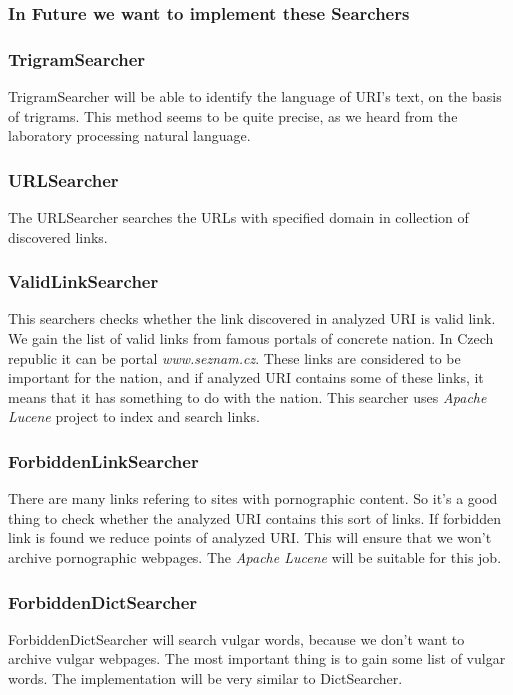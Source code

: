 \documentclass[11pt,a4paper]{article}
\begin{document}
\subsubsection*{In Future we want to implement these Searchers}

\subsubsection*{TrigramSearcher}
TrigramSearcher will be able to identify the language of URI's text, on the basis of trigrams. This method seems to be quite precise, as we heard from the laboratory processing natural language.

\subsubsection*{URLSearcher}
The URLSearcher searches the URLs with specified domain in collection of discovered links.

\subsubsection*{ValidLinkSearcher}
This searchers checks whether the link discovered in analyzed URI is valid link. We gain the list of valid links from famous portals of concrete nation. In Czech republic it can be portal \emph{www.seznam.cz}. These links are considered to be important for the nation, and if analyzed URI contains some of these links, it means that it has something to do with the nation. This searcher uses \emph{Apache Lucene} project to index and search links.

\subsubsection*{ForbiddenLinkSearcher}
There are many links refering to sites with pornographic content. So it's a good thing to check whether the analyzed URI contains this sort of links. If forbidden link is found
we reduce points of analyzed URI. This will ensure that we won't archive pornographic webpages. The \emph{Apache Lucene} will be suitable for this job. 

\subsubsection*{ForbiddenDictSearcher}
ForbiddenDictSearcher will search vulgar words, because we don't want to archive vulgar webpages. The most important thing is to gain some list of vulgar words. The implementation will be very similar to DictSearcher.
\end{document}
